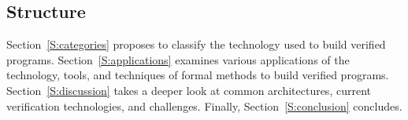 \subsection{Structure}

Section~\ref{S:categories} proposes to classify the technology used to build
verified programs. Section~\ref{S:applications} examines various applications of
the technology, tools, and techniques of formal methods to build verified
programs. Section~\ref{S:discussion} takes a deeper look at common
architectures, current verification technologies, and challenges. Finally,
Section~\ref{S:conclusion} concludes.

